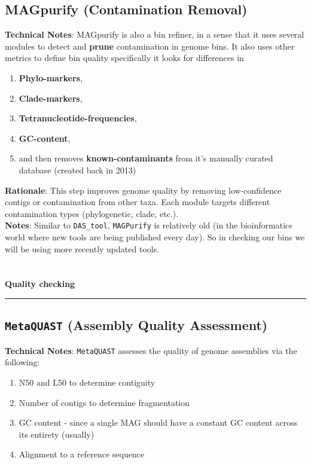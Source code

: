 \documentclass[11pt]{report}
\begin{document}
{\subsection{MAGpurify (Contamination Removal)}
\textbf{Technical Notes}: MAGpurify is also a bin refiner, in a sense that it uses several modules to detect and \textbf{prune} contamination in genome bins. It also uses other metrics to define bin quality specifically it looks for differences in 
	\begin{enumerate}
		\item \textbf{Phylo-markers},
		\item \textbf{Clade-markers}, 
		\item \textbf{Tetranucleotide-frequencies},
		\item \textbf{GC-content},
		\item and then removes \textbf{known-contaminants} from it's manually curated database (created back in 2013)
	\end{enumerate}   
\textbf{Rationale}: This step improves genome quality by removing low-confidence contigs or contamination from other taxa. Each module targets different contamination types (phylogenetic, clade, etc.). \\
\textbf{Notes}: Similar to \texttt{DAS\_tool}, \texttt{MAGPurify} is relatively old (in the bioinformatics world where new tools are being published every day). So in checking our bins we will be using more recently updated tools. 
\\
\\
\\ 
\textbf{Quality checking} \\
\rule{\linewidth}{0.5mm}


\subsection{\texttt{MetaQUAST} (Assembly Quality Assessment)} 
\textbf{Technical Notes}: \texttt{MetaQUAST} assesses the quality of genome assemblies via the following:
	\begin{enumerate}
		\item N50 and L50 to determine contiguity
		\item Number of contigs to determine fragmentation
		\item GC content - since a single MAG should have a constant GC content across its entirety (usually)
		\item Alignment to a reference sequence
		

\end{enumerate}}
\end{document}
